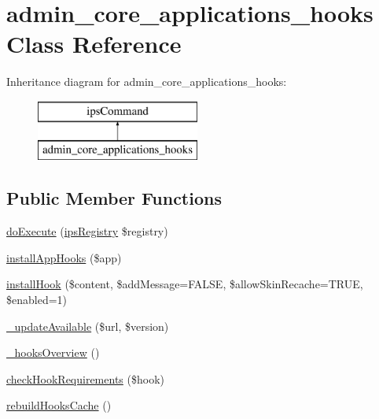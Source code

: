 \hypertarget{classadmin__core__applications__hooks}{\section{admin\-\_\-core\-\_\-applications\-\_\-hooks Class Reference}
\label{classadmin__core__applications__hooks}
}
Inheritance diagram for admin\-\_\-core\-\_\-applications\-\_\-hooks\-:\begin{figure}[H]
\begin{center}
\leavevmode
\includegraphics[height=2.000000cm]{classadmin__core__applications__hooks}
\end{center}
\end{figure}
\subsection*{Public Member Functions}
\begin{DoxyCompactItemize}
\item 
\hyperlink{classadmin__core__applications__hooks_afbc4e912a0604b94d47d66744c64d8ba}{do\-Execute} (\hyperlink{classips_registry}{ips\-Registry} \$registry)
\item 
\hyperlink{classadmin__core__applications__hooks_ab175b6159af353a6357b85ad8c4dcdc8}{install\-App\-Hooks} (\$app)
\item 
\hyperlink{classadmin__core__applications__hooks_ab21a25837b90c3408398e6862e85cc9d}{install\-Hook} (\$content, \$add\-Message=F\-A\-L\-S\-E, \$allow\-Skin\-Recache=T\-R\-U\-E, \$enabled=1)
\item 
\hyperlink{classadmin__core__applications__hooks_af4a77dbf4fd5817354ed06738387fb3b}{\-\_\-update\-Available} (\$url, \$version)
\item 
\hyperlink{classadmin__core__applications__hooks_a5e6ce9b3957a7cf3425495c88a9f1366}{\-\_\-hooks\-Overview} ()
\item 
\hyperlink{classadmin__core__applications__hooks_aac78fd46214c14ee32690846cd182f4b}{check\-Hook\-Requirements} (\$hook)
\item 
\hyperlink{classadmin__core__applications__hooks_a22bf52194866772d3a6cb2ef7c1560ac}{rebuild\-Hooks\-Cache} ()
\end{DoxyCompactItemize}
